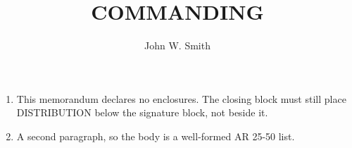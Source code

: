 \documentclass{../armymemo}
\author{John W. Smith}\rank{CPT}\branch{CY}
\title{COMMANDING}
\begin{document}
\begin{enumerate}
	\item This memorandum declares no enclosures. The closing block must still place
	      DISTRIBUTION below the signature block, not beside it.
	\item A second paragraph, so the body is a well-formed AR 25-50 list.
\end{enumerate}
\end{document}
